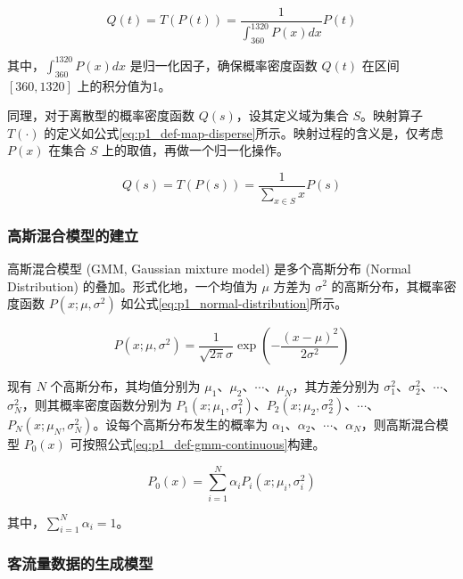 \documentclass[12pt,a4paper]{mcmthesis}
\begin{document}
\begin{equation}
	Q(t) = T(P(t)) = \frac{1}{\int_{360}^{1320}P(x)dx} P(t)
	\label{eq:p1_def-map-continuous}
\end{equation}

其中，$\int_{360}^{1320}P(x)dx$ 是归一化因子，确保概率密度函数 $Q(t)$ 在区间 $[360,1320]$ 上的积分值为1。

同理，对于离散型的概率密度函数 $Q(s)$，设其定义域为集合 $S$。映射算子 $T(\cdot)$ 的定义如公式\ref{eq:p1_def-map-disperse}所示。映射过程的含义是，仅考虑$P(x)$ 在集合 $S$ 上的取值，再做一个归一化操作。

\begin{equation}
	Q(s) = T(P(s)) = \frac{1}{\sum_{x \in S} x} P(s)
	\label{eq:p1_def-map-disperse}
\end{equation}

\subsubsection{高斯混合模型的建立}

高斯混合模型 (GMM, Gaussian mixture model) 是多个高斯分布 (Normal Distribution) 的叠加。形式化地，一个均值为 $\mu$ 方差为 $\sigma^2$ 的高斯分布，其概率密度函数 $P(x;\mu,\sigma^2)$ 如公式\ref{eq:p1_normal-distribution}所示。

\begin{equation}
	P(x;\mu,\sigma^2) = \frac{1}{\sqrt{2\pi}\sigma} \exp \left( - \frac{(x-\mu)^2}{2\sigma^2} \right)
	\label{eq:p1_normal-distribution}
\end{equation}

现有 $N$ 个高斯分布，其均值分别为 $\mu_1$、$\mu_2$、$\cdots$、$\mu_N$，其方差分别为 $\sigma^2_1$、$\sigma^2_2$、$\cdots$、$\sigma^2_N$，则其概率密度函数分别为 $P_1(x;\mu_1,\sigma^2_1)$、$P_2(x;\mu_2,\sigma^2_2)$、$\cdots$、$P_N(x;\mu_N,\sigma^2_N)$。设每个高斯分布发生的概率为 $\alpha_1$、$\alpha_2$、$\cdots$、$\alpha_N$，则高斯混合模型 $P_0(x)$ 可按照公式\ref{eq:p1_def-gmm-continuous}构建。

\begin{equation}
	P_0(x) = \sum_{i=1}^{N} \alpha_i P_i(x;\mu_i,\sigma^2_i)
	\label{eq:p1_def-gmm-continuous}
\end{equation}

其中，$\sum_{i=1}^{N} \alpha_i=1$。



\subsubsection{客流量数据的生成模型}
\end{document}
